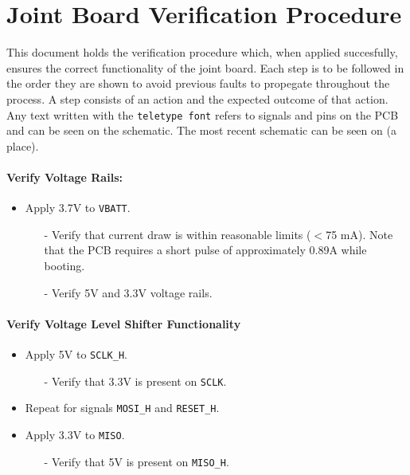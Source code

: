 \section{Joint Board Verification Procedure} %
\label{sec:joint_board_verification_procedure}
This document holds the verification procedure which, when applied succesfully, ensures the correct functionality of the joint board.
Each step is to be followed in the order they are shown to avoid previous faults to propegate throughout the process.
A step consists of an action and the expected outcome of that action.
Any text written with the \texttt{teletype font} refers to signals and pins on the PCB and can be seen on the schematic.
The most recent schematic can be seen on (a place).
\paragraph{Verify Voltage Rails:} %
 \label{par:verify_voltage_rails}
 \begin{itemize}
 	\item Apply 3.7V to \texttt{VBATT}.
 	\begin{itemize}
 		\item[-] Verify that current draw is within reasonable limits ($<$75 mA). Note that the PCB requires a short pulse of approximately 0.89A while booting.
 		\item[-] Verify 5V and 3.3V voltage rails.
 	\end{itemize}
 \end{itemize}

\paragraph{Verify Voltage Level Shifter Functionality} %
\label{par:verify_voltage_level_shifter_functionality}
\begin{itemize}
	\item Apply 5V to \texttt{SCLK\_H}.
	\begin{itemize}
		\item [-] Verify that 3.3V is present on \texttt{SCLK}.
	\end{itemize}
	\item Repeat for signals \texttt{MOSI\_H} and \texttt{RESET\_H}.
	\item Apply 3.3V to \texttt{MISO}.
	\begin{itemize}
		\item [-] Verify that 5V is present on \texttt{MISO\_H}.
	\end{itemize}
\end{itemize}

